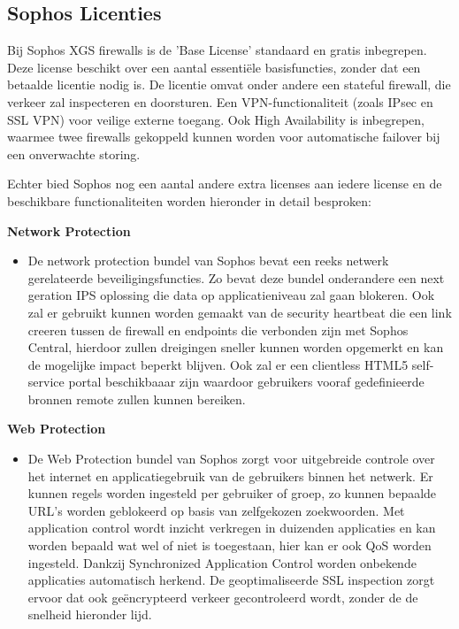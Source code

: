\subsection{Sophos Licenties}
Bij Sophos XGS firewalls is de 'Base License' standaard en gratis inbegrepen. Deze license beschikt over een aantal essentiële basisfuncties, zonder dat een betaalde licentie nodig is. De licentie omvat onder andere een stateful firewall, die verkeer zal inspecteren en doorsturen. Een VPN-functionaliteit (zoals IPsec en SSL VPN) voor veilige externe toegang. Ook High Availability is inbegrepen, waarmee twee firewalls gekoppeld kunnen worden voor automatische failover bij een onverwachte storing.

Echter bied Sophos nog een aantal andere extra licenses aan iedere license en de beschikbare functionaliteiten worden hieronder in detail besproken:

\textbf{Network Protection}
\begin{itemize}[label=\textbullet]
    \item De network protection bundel van Sophos bevat een reeks netwerk gerelateerde beveiligingsfuncties. Zo bevat deze bundel onderandere een next geration IPS oplossing die data op applicatieniveau zal gaan blokeren. Ook zal er gebruikt kunnen worden gemaakt van de security heartbeat die een link creeren tussen de firewall en endpoints die verbonden zijn met Sophos Central, hierdoor zullen dreigingen sneller kunnen worden opgemerkt en kan de mogelijke impact beperkt blijven. Ook zal er een clientless HTML5 self-service portal beschikbaaar zijn waardoor gebruikers vooraf gedefinieerde bronnen remote zullen kunnen bereiken.
\end{itemize}

\textbf{Web Protection}
\begin{itemize}[label=\textbullet]
    \item De Web Protection bundel van Sophos zorgt voor uitgebreide controle over het internet en applicatiegebruik van de gebruikers binnen het netwerk. Er kunnen regels worden ingesteld per gebruiker of groep, zo kunnen bepaalde URL's worden geblokeerd op basis van zelfgekozen zoekwoorden. Met application control wordt inzicht verkregen in duizenden applicaties en kan worden bepaald wat wel of niet is toegestaan, hier kan er ook QoS worden ingesteld. Dankzij Synchronized Application Control worden onbekende applicaties automatisch herkend. De geoptimaliseerde SSL inspection zorgt ervoor dat ook geëncrypteerd verkeer gecontroleerd wordt, zonder de de snelheid hieronder lijd.
\end{itemize}

